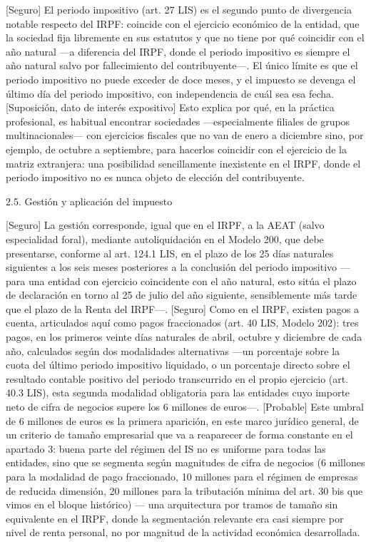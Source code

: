 \documentclass[10pt,a4paper]{article}
\begin{document}
[Seguro] El periodo impositivo (art. 27 LIS) es el segundo punto de divergencia notable respecto del IRPF: coincide con el ejercicio económico de la entidad, que la sociedad fija libremente en sus estatutos y que no tiene por qué coincidir con el año natural —a diferencia del IRPF, donde el periodo impositivo es siempre el año natural salvo por fallecimiento del contribuyente—. El único límite es que el periodo impositivo no puede exceder de doce meses, y el impuesto se devenga el último día del periodo impositivo, con independencia de cuál sea esa fecha. [Suposición, dato de interés expositivo] Esto explica por qué, en la práctica profesional, es habitual encontrar sociedades —especialmente filiales de grupos multinacionales— con ejercicios fiscales que no van de enero a diciembre sino, por ejemplo, de octubre a septiembre, para hacerlos coincidir con el ejercicio de la matriz extranjera: una posibilidad sencillamente inexistente en el IRPF, donde el periodo impositivo no es nunca objeto de elección del contribuyente.

2.5. Gestión y aplicación del impuesto

[Seguro] La gestión corresponde, igual que en el IRPF, a la AEAT (salvo especialidad foral), mediante autoliquidación en el Modelo 200, que debe presentarse, conforme al art. 124.1 LIS, en el plazo de los 25 días naturales siguientes a los seis meses posteriores a la conclusión del periodo impositivo —para una entidad con ejercicio coincidente con el año natural, esto sitúa el plazo de declaración en torno al 25 de julio del año siguiente, sensiblemente más tarde que el plazo de la Renta del IRPF—. [Seguro] Como en el IRPF, existen pagos a cuenta, articulados aquí como pagos fraccionados (art. 40 LIS, Modelo 202): tres pagos, en los primeros veinte días naturales de abril, octubre y diciembre de cada año, calculados según dos modalidades alternativas —un porcentaje sobre la cuota del último periodo impositivo liquidado, o un porcentaje directo sobre el resultado contable positivo del periodo transcurrido en el propio ejercicio (art. 40.3 LIS), esta segunda modalidad obligatoria para las entidades cuyo importe neto de cifra de negocios supere los 6 millones de euros—. [Probable] Este umbral de 6 millones de euros es la primera aparición, en este marco jurídico general, de un criterio de tamaño empresarial que va a reaparecer de forma constante en el apartado 3: buena parte del régimen del IS no es uniforme para todas las entidades, sino que se segmenta según magnitudes de cifra de negocios (6 millones para la modalidad de pago fraccionado, 10 millones para el régimen de empresas de reducida dimensión, 20 millones para la tributación mínima del art. 30 bis que vimos en el bloque histórico) — una arquitectura por tramos de tamaño sin equivalente en el IRPF, donde la segmentación relevante era casi siempre por nivel de renta personal, no por magnitud de la actividad económica desarrollada.
\end{document}
